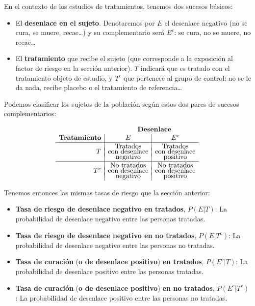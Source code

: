 \documentclass[
]{book}
\theoremstyle{definition}
\theoremstyle{definition}
\theoremstyle{definition}
\theoremstyle{definition}
\theoremstyle{remark}
\begin{document}
En el contexto de los estudios de tratamientos, tenemos dos sucesos básicos:

\begin{itemize}
\item
  El \textbf{desenlace en el sujeto}. Denotaremos por \(E\) el desenlace negativo (no se cura, se muere, recae\ldots) y su complementario será \(E^c\): se cura, no se muere, no recae\ldots{}
\item
  El \textbf{tratamiento} que recibe el sujeto (que corresponde a la exposición al factor de riesgo en la sección anterior). \(T\) indicará que es tratado con el tratamiento objeto de estudio, y \(T^c\) que pertenece al grupo de control: no se le da nada, recibe placebo o el tratamiento de referencia\ldots{}
\end{itemize}

Podemos clasificar los sujetos de la población según estos dos pares de sucesos complementarios:

\[
\begin{array}{l}
\hphantom{TratamientTratamientooo} \textbf{Desenlace}\\
\begin{array}{r|c|c}
\textbf{Tratamiento} & E & E^c \\ \hline
 & \text{Tratados} & \text{Tratados} \\[-1ex]   
T & \text{con desenlace} & \text{con desenlace} \\[-1ex] 
 & \text{negativo} & \text{positivo} \\ 
 \hline
& \text{No tratados} & \text{No tratados} \\[-1ex]      
T^c & \text{con desenlace} & \text{con desenlace} \\[-1ex]  
 & \text{negativo} & \text{positivo} 
\end{array}
\end{array}
\]

Tenemos entonces las mismas tasas de riesgo que la sección anterior:

\begin{itemize}
\item
  \textbf{Tasa de riesgo de desenlace negativo en tratados}, \(P(E|T)\): La probabilidad de desenlace negativo entre las personas tratadas.
\item
  \textbf{Tasa de riesgo de desenlace negativo en no tratados}, \(P(E|T^c)\): La probabilidad de desenlace negativo entre las personas no tratadas.
\item
  \textbf{Tasa de curación} (\textbf{o de desenlace positivo}) \textbf{en tratados}, \(P(E^c|T)\): La probabilidad de desenlace positivo entre las personas tratadas.
\item
  \textbf{Tasa de curación} (\textbf{o de desenlace positivo}) \textbf{en no tratados}, \(P(E^c|T^c)\): La probabilidad de desenlace positivo entre las personas no tratadas.
\end{itemize}
\end{document}
